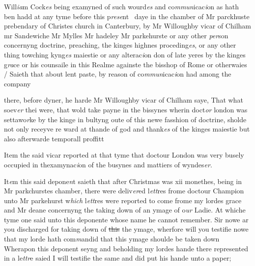 \documentclass[12pt, a4paper]{book}
\begin{document}
			


		\ifthenelse{\isodd{\thepage}}
		{\reversemarginpar}
		{\normalmarginpar}
		
Will\textit{ia}m Cock\textit{es }being examyned of such wourd\textit{es}
and co\textit{mmun}icac\textit{i}on as hath ben hadd at any tyme before this p\textit{rese}nt 
daye in the chamber of Mr parckhuste prebendary 
of Christes church in Canterbury, by Mr Willoughby
vicar of Chilham mr Sandewiche Mr Mylles
Mr hadeley Mr parkehurste or any other \textit{per}son 
concernyng doctrine, preaching, the kinges highnes
proceding\textit{es}, or any other thing towching 
			kyng\textit{es} maiestie 
or any alterac\textit{i}on don of late yeres by the kinges g\textit{ra}ce
or his counsaile in this Realme againste the bisshop
of Rome or otherwaies / Saieth that about 
lent paste, by reason of co\textit{mmun}icac\textit{i}on had among the company

				\marginpar[\vspace{0.5cm}{\textcolor{Gray}{D. willoughby}}]{}
			
            		
				\marginpar[\vspace{0.5cm}{\textcolor{Gray}{n}}]{}
			
            		
		\ifthenelse{\isodd{\thepage}}
		{\reversemarginpar}
		{\normalmarginpar}
		there, before dyner, he harde Mr Willoughby vicar
 of Chilham saye, That what soev\textit{er} thei were, that wold
take payne in the bissynes wherin doct\textit{or} london was
settawo\textit{r}ke by the kinge in bultyng oute of this newe
fasshion of doctrine, sholde not only receyve re
			ward
at thande of god and thank\textit{es} of the kinges maiestie
but also afterwarde temporall proffitt

		\ifthenelse{\isodd{\thepage}}
		{\reversemarginpar}
		{\normalmarginpar}
		Item the said vicar reported at that tyme that doctour
London was very busely occupied in thexamynac\textit{i}on of 
the busynes and mattiers of wyndes\textit{er}.

            		
		\ifthenelse{\isodd{\thepage}}
		{\reversemarginpar}
		{\normalmarginpar}
		It\textit{e}m this said depone\textit{n}t saieth that after Christmas was
xii monethes, being in Mr parkchurstes chamber, there were
deliv\textit{er}ed l\textit{ett}res frome doctour Champion unto Mr parkehurst
w\textit{hich} l\textit{ett}res were reported to come frome my lordes grace 
and Mr deane concernyng the taking down of 
an ymage of o\textit{ur} Ladie. At whiche tyme one said unto
this deponente whose name he cannot remember. Sir 
nowe ar you discharged for taking down of \sout{this }the 
ymage, wherfore will you testifie nowe that my lorde
hath com\textit{m}andid that this ymage shoulde be taken down
Wherapon this deponent seyng and beholding my lordes
hande there represented in a le\textit{ttr}e saied I will testifie
the same and did put his hande unto a paper; 
\end{document}
